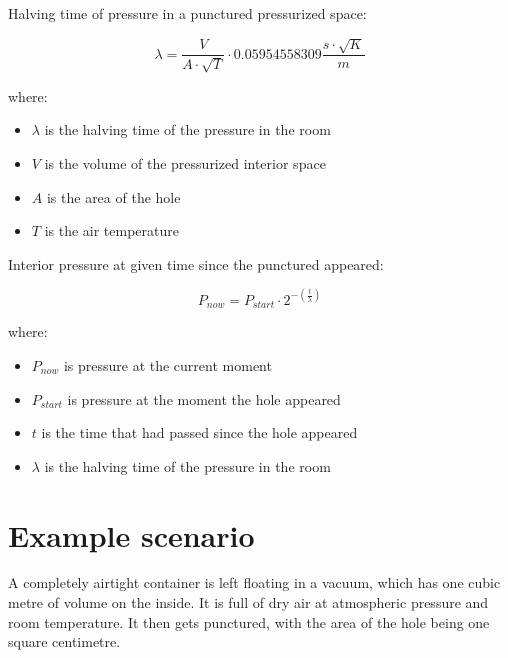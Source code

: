 \documentclass[a4paper]{article}
\begin{document}
   	\bigskip
   	
	Halving time of pressure in a punctured pressurized space:
	
	$$ \lambda = \frac{V}{A \cdot \sqrt{T}} \cdot 0.05954558309\frac{s \cdot \sqrt{K}}{m} $$
	    
	where:
	    
	\begin{itemize}
		\item $\lambda$ is the halving time of the pressure in the room
	    
	    \item $V$ is the volume of the pressurized interior space
	    
	    \item $A$ is the area of the hole
	            
	    \item $T$ is the air temperature
	\end{itemize}
	
	Interior pressure at given time since the punctured appeared:
	
	$$ P_{now} = P_{start} \cdot 2^{-(\frac{t}{\lambda})} $$
		
	where:
	
	\begin{itemize}
		\item $P_{now}$ is pressure at the current moment
		    
		\item $P_{start}$ is pressure at the moment the hole appeared
		
		\item $t$ is the time that had passed since the hole appeared
		
		\item $\lambda$ is the halving time of the pressure in the room
	\end{itemize}
    
	\pagebreak
	
	\section{Example scenario}
	
	A completely airtight container is left floating in a vacuum, which has one cubic metre of volume on the inside. It is full of dry air at atmospheric pressure and room temperature. It then gets punctured, with the area of the hole being one square centimetre.
	
	\bigskip
	
\end{document}
